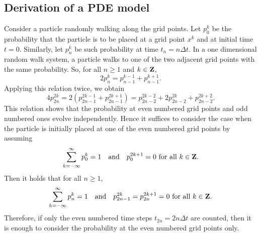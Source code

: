 \documentclass[11pt]{amsart}
\def\Z{\mathbb{Z}}
\def\Z{{\bf Z}}
\begin{document}
\subsection{Derivation of a PDE model}

Consider a particle randomly walking along the grid points. Let $p_0^k$ be the probability that the particle is to be placed at a grid point $x^k$ and at initial time $t=0$. Similarly, let $p_n^k$ be such probability at time $t_n=n\Delta t$. In a one dimensional random walk system, a particle walks to one of the two adjacent grid points with the same probability. So, for all $n\geq 1$ and $k\in\Z$,
\begin{equation*}\label{pnk}
2p_n^k = p_{n-1}^{k-1} + p_{n-1}^{k+1}.
\end{equation*}
Applying this relation twice, we obtain
\begin{equation}\label{p2n2k}
4p_{2n}^{2k}=2(p_{2n-1}^{2k-1} + p_{2n-1}^{2k+1}) =p_{2n-2}^{2k-2}+2p_{2n-2}^{2k}+p_{2n-2}^{2k+2}.
\end{equation}
This relation shows that the probability at even numbered grid points and odd numbered ones evolve independently. Hence it suffices to consider the case when the particle is initially placed at one of the even numbered grid points by assuming
\begin{equation}\label{p0Odd}
\sum_{k=-\infty}^\infty p_0^k=1\quad\text{and}\quad p^{2k+1}_0=0 \text{~for all $k\in\Z$}.
\end{equation}
Then it holds that for all $n\geq 1$,
\begin{equation*}\label{p0Even}
\sum_{k=-\infty}^\infty p_n^k=1\quad\text{and}\quad p^{2k}_{2n-1}=p^{2k+1}_{2n}=0 \text{~for all $k\in\Z$.}
\end{equation*}
Therefore, if only the even numbered time steps $t_{2n}=2n\Delta t$ are counted, then it is enough to consider the probability at the even numbered grid points only.
\end{document}
